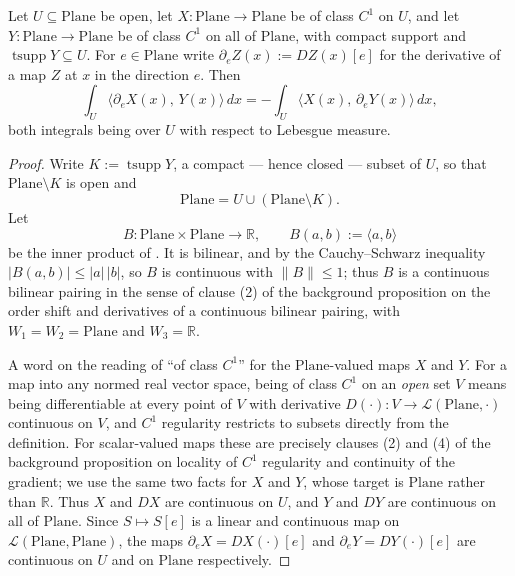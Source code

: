 \begin{lemma}
Let $U\subseteq\mathrm{Plane}$ be open, let $X\colon\mathrm{Plane}\to\mathrm{Plane}$ be of class
$C^{1}$ on $U$, and let $Y\colon\mathrm{Plane}\to\mathrm{Plane}$ be of class $C^{1}$ on all of
$\mathrm{Plane}$, with compact support and $\operatorname{tsupp}Y\subseteq U$.  For
$e\in\mathrm{Plane}$ write $\partial_eZ(x):=DZ(x)[e]$ for the derivative of a map $Z$ at $x$ in
the direction $e$.  Then
\[
  \int_U\bigl\langle\partial_eX(x),\,Y(x)\bigr\rangle\,dx
  =-\int_U\bigl\langle X(x),\,\partial_eY(x)\bigr\rangle\,dx ,
\]
both integrals being over $U$ with respect to Lebesgue measure.
\end{lemma}
\begin{proof}
Write $K:=\operatorname{tsupp}Y$, a compact --- hence closed --- subset of $U$, so that
$\mathrm{Plane}\setminus K$ is open and
\begin{equation}\label{eq:dibp-cover}
  \mathrm{Plane}=U\cup(\mathrm{Plane}\setminus K).
\end{equation}
Let
\[
  B\colon\mathrm{Plane}\times\mathrm{Plane}\to\mathbb{R},\qquad
  B(a,b):=\langle a,b\rangle
\]
be the inner product of .  It is bilinear, and by the Cauchy--Schwarz inequality
$\lvert B(a,b)\rvert\le\lvert a\rvert\,\lvert b\rvert$, so $B$ is continuous with
$\lVert B\rVert\le1$; thus $B$ is a continuous bilinear pairing in the sense of clause (2) of
the background proposition on the order shift and derivatives of a continuous bilinear pairing,
with $W_1=W_2=\mathrm{Plane}$ and $W_3=\mathbb{R}$.

A word on the reading of ``of class $C^{1}$'' for the $\mathrm{Plane}$-valued maps $X$ and $Y$.
For a map into any normed real vector space, being of class $C^{1}$ on an \emph{open} set $V$
means being differentiable at every point of $V$ with derivative
$D(\cdot)\colon V\to\mathcal{L}(\mathrm{Plane},\cdot)$ continuous on $V$, and $C^{1}$ regularity
restricts to subsets directly from the definition.  For scalar-valued maps these are precisely
clauses (2) and (4) of the background proposition on locality of $C^{1}$ regularity and
continuity of the gradient; we use the same two facts for $X$ and $Y$, whose target is
$\mathrm{Plane}$ rather than $\mathbb{R}$.  Thus $X$ and $DX$ are continuous on $U$, and $Y$ and
$DY$ are continuous on all of $\mathrm{Plane}$.  Since $S\mapsto S[e]$ is a linear and
continuous map on $\mathcal{L}(\mathrm{Plane},\mathrm{Plane})$, the maps
$\partial_eX=DX(\cdot)[e]$ and $\partial_eY=DY(\cdot)[e]$ are continuous on $U$ and on
$\mathrm{Plane}$ respectively.


\end{proof}
